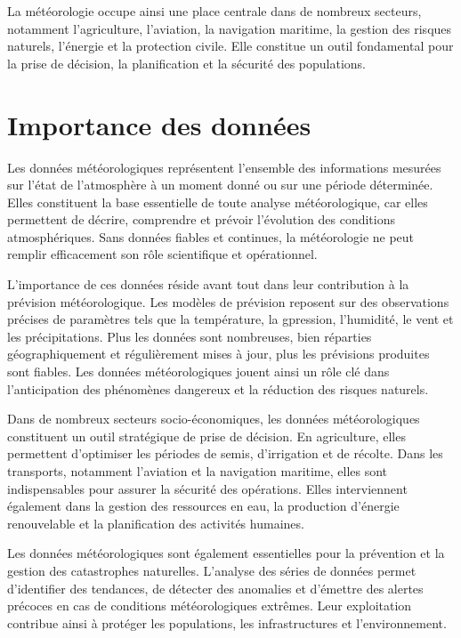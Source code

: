 La météorologie occupe ainsi une place centrale dans de nombreux secteurs, notamment l’agriculture, l’aviation, la navigation maritime, la gestion des risques naturels, l’énergie et la protection civile. Elle constitue un outil fondamental pour la prise de décision, la planification et la sécurité des populations.


\clearpage
\section{ Importance des données}
Les données météorologiques représentent l’ensemble des informations mesurées sur l’état de l’atmosphère à un moment donné ou sur une période déterminée. Elles constituent la base essentielle de toute analyse météorologique, car elles permettent de décrire, comprendre et prévoir l’évolution des conditions atmosphériques. Sans données fiables et continues, la météorologie ne peut remplir efficacement son rôle scientifique et opérationnel.

L’importance de ces données réside avant tout dans leur contribution à la prévision météorologique. Les modèles de prévision reposent sur des observations précises de paramètres tels que la température, la gpression, l’humidité, le vent et les précipitations. Plus les données sont nombreuses, bien réparties géographiquement et régulièrement mises à jour, plus les prévisions produites sont fiables. Les données météorologiques jouent ainsi un rôle clé dans l’anticipation des phénomènes dangereux et la réduction des risques naturels.

Dans de nombreux secteurs socio-économiques, les données météorologiques constituent un outil stratégique de prise de décision. En agriculture, elles permettent d’optimiser les périodes de semis, d’irrigation et de récolte. Dans les transports, notamment l’aviation et la navigation maritime, elles sont indispensables pour assurer la sécurité des opérations. Elles interviennent également dans la gestion des ressources en eau, la production d’énergie renouvelable et la planification des activités humaines.

Les données météorologiques sont également essentielles pour la prévention et la gestion des catastrophes naturelles. L’analyse des séries de données permet d’identifier des tendances, de détecter des anomalies et d’émettre des alertes précoces en cas de conditions météorologiques extrêmes. Leur exploitation contribue ainsi à protéger les populations, les infrastructures et l’environnement.


